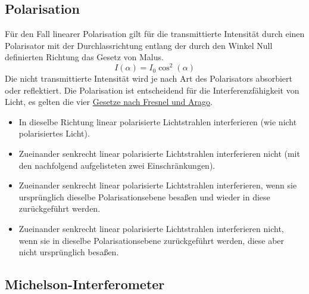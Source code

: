 \documentclass[ngerman]{scrartcl}
\begin{document}
\subsection{Polarisation}
\label{sec:grundlagen_polarisation}

Für den Fall linearer Polarisation gilt für die transmittierte Intensität durch einen Polarisator mit der Durchlassrichtung entlang der durch den Winkel Null definierten Richtung das Gesetz von Malus.
\begin{equation}
    \label{eq:malus}
    I(\alpha) = I_0 \cos^2(\alpha)
\end{equation}
Die nicht transmittierte Intensität wird je nach Art des Polarisators absorbiert oder reflektiert. Die Polarisation ist entscheidend für die Interferenzfähigkeit von Licht, es gelten die vier \underline{Gesetze nach Fresnel und Arago}.
\begin{framed}
    \begin{itemize}
        \item In dieselbe Richtung linear polarisierte Lichtstrahlen interferieren (wie nicht polarisiertes Licht).
        \item Zueinander senkrecht linear polarisierte Lichtstrahlen interferieren nicht (mit den nachfolgend aufgelisteten zwei Einschränkungen).
        \item Zueinander senkrecht linear polarisierte Lichtstrahlen interferieren, wenn sie ursprünglich dieselbe Polarisationsebene besaßen und wieder in diese zurückgeführt werden.
        \item  Zueinander senkrecht linear polarisierte Lichtstrahlen interferieren nicht, wenn sie in dieselbe Polarisationsebene zurückgeführt werden, diese aber nicht ursprünglich besaßen.
    \end{itemize}
\end{framed}

\subsection{Michelson-Interferometer}
\label{sec:grundlagen_michelson_interferometer}
\end{document}
